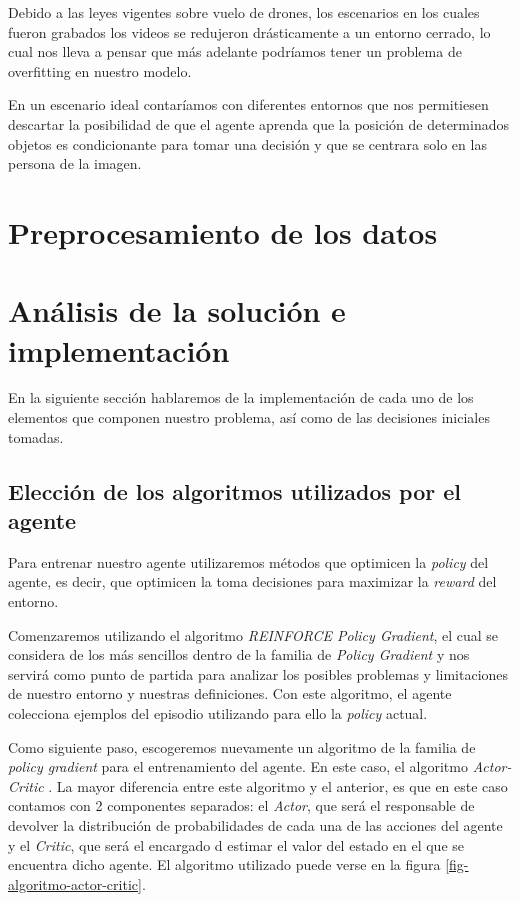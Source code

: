 Debido a las leyes vigentes sobre vuelo de drones, los escenarios en los cuales fueron grabados los videos se redujeron drásticamente a un entorno cerrado, lo cual nos lleva a pensar que más adelante podríamos tener un problema de overfitting en nuestro modelo.
\medskip

En un escenario ideal contaríamos con diferentes entornos que nos permitiesen descartar la posibilidad de que el agente aprenda que la posición de determinados objetos es condicionante para tomar una decisión y que se centrara solo en las persona de la imagen.
\medskip

\section{Preprocesamiento de los datos}
\label{preprocesamiento-datos}


\section{Análisis de la solución e implementación}
\label{analisis-de-la-solucion-e-implementacion}

En la siguiente sección hablaremos de la implementación de cada uno de los elementos que componen nuestro problema, así como de las decisiones iniciales tomadas.
\subsection{Elección de los algoritmos utilizados por el agente}
\label{eleccion-de-algoritmos}

Para entrenar nuestro agente utilizaremos métodos que optimicen la \textit{policy} del agente, es decir, que optimicen la toma decisiones para maximizar la \textit{reward} del entorno.
\medskip

Comenzaremos utilizando el algoritmo \textit{REINFORCE Policy Gradient}, el cual se considera de los más sencillos dentro de la familia de \textit{Policy Gradient} y nos servirá como punto de partida para analizar los posibles problemas y limitaciones de nuestro entorno y nuestras definiciones. Con este algoritmo, el agente colecciona ejemplos del episodio utilizando para ello la \textit{policy} actual.
\medskip



Como siguiente paso, escogeremos nuevamente un algoritmo de la familia de \textit{policy gradient} para el entrenamiento del agente. En este caso, el algoritmo \textit{Actor-Critic} \citep{DBLP:journals/corr/abs-1801-01290}. La mayor diferencia entre este algoritmo y el anterior, es que en este caso contamos con 2 componentes separados: el \textit{Actor}, que será el responsable de devolver la distribución de probabilidades de cada una de las acciones del agente y el \textit{Critic}, que será el encargado d estimar el valor del estado en el que se encuentra dicho agente. El algoritmo utilizado puede verse en la figura \ref{fig-algoritmo-actor-critic}.
\medskip

